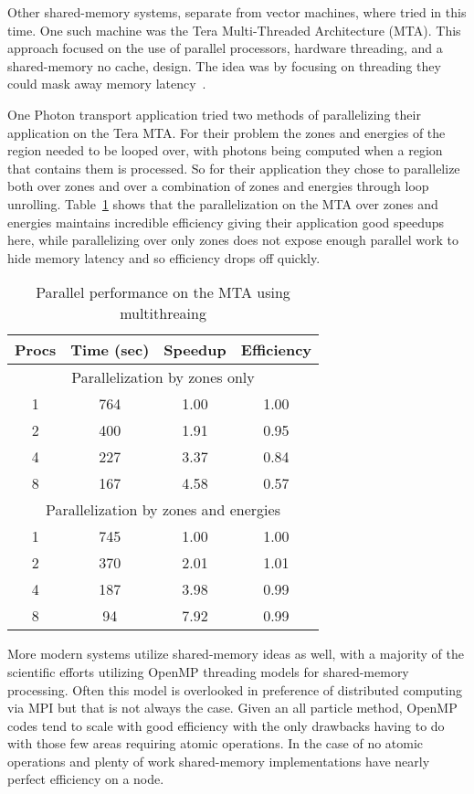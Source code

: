%
Other shared-memory systems, separate from vector machines, where tried in this time.
%
One such machine was the Tera Multi-Threaded Architecture (MTA).
%
This approach focused on the use of parallel processors, hardware threading, and a shared-memory no cache, design.
%
The idea was by focusing on threading they could mask away memory latency~\cite{majumdar2000parallel, snavely1998multi}.
%

%
One Photon transport application tried two methods of parallelizing their application on the Tera MTA. 
%
For their problem the zones and energies of the region needed to be looped over, with photons being computed when a region that contains them is processed.
%
So for their application they chose to parallelize both over zones and over a combination of zones and energies through loop unrolling.
%
Table~\ref{tab:MTAPerf} shows that the parallelization on the MTA over zones and energies maintains incredible efficiency giving their application good speedups here, while parallelizing over only zones does not expose enough parallel work to hide memory latency and so efficiency drops off quickly.
%
\begin{table}
\caption {Parallel performance on the MTA using multithreaing} \label{tab:MTAPerf} 
\begin{center}
\begin{tabular}{|c|c|c|c|}
\hline
Procs & Time (sec) & Speedup & Efficiency \\
\hline
\multicolumn{4}{|c|}{Parallelization by zones only} \\
\hline
1 & 764 & 1.00 & 1.00 \\
\hline
2 & 400 & 1.91 & 0.95 \\
\hline
4 & 227 & 3.37 & 0.84 \\
\hline
8 & 167 & 4.58 & 0.57 \\
\hline
\multicolumn{4}{|c|}{Parallelization by zones and energies} \\
\hline
1 & 745 & 1.00 & 1.00 \\
\hline
2 & 370 & 2.01 & 1.01 \\
\hline
4 & 187 & 3.98 & 0.99 \\
\hline
8 & 94 & 7.92 & 0.99 \\
\hline
\end{tabular}
\end{center}
\end{table}

More modern systems utilize shared-memory ideas as well, with a majority of the scientific efforts utilizing OpenMP threading models for shared-memory processing.
%
Often this model is overlooked in preference of distributed computing via MPI but that is not always the case.
%
Given an all particle method, OpenMP codes tend to scale with good efficiency with the only drawbacks having to do with those few areas requiring atomic operations.
%
In the case of no atomic operations and plenty of work shared-memory implementations have nearly perfect efficiency on a node.


